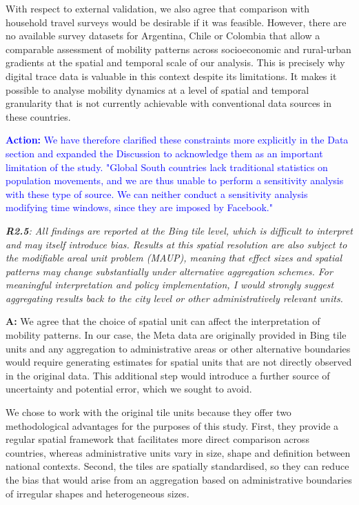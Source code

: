 \documentclass[12pt,a4paper,oneside, reqno]{amsart}
\begin{document}
With respect to external validation, we also agree that comparison with household travel surveys would be desirable if it was feasible. However, there are no available survey datasets for Argentina, Chile or Colombia that allow a comparable assessment of mobility patterns across socioeconomic and rural-urban gradients at the spatial and temporal scale of our analysis. This is precisely why digital trace data is valuable in this context despite its limitations. It makes it possible to analyse mobility dynamics at a level of spatial and temporal granularity that is not currently achievable with conventional data sources in these countries.

\textcolor{blue}{\textbf{Action:} We have therefore clarified these constraints more explicitly in the Data section and expanded the Discussion to acknowledge them as an important limitation of the study. "Global South countries lack traditional statistics on population movements, and we are thus unable to perform  a sensitivity analysis with these type of source. We can neither conduct a sensitivity analysis modifying time windows, since they are imposed by Facebook."}

\setlength{\leftskip}{0cm} \textit{\textbf{R2.5}: All findings are reported at the Bing tile level, which is difficult to interpret and may itself introduce bias. Results at this spatial resolution are also subject to the modifiable areal unit problem (MAUP), meaning that effect sizes and spatial patterns may change substantially under alternative aggregation schemes. For meaningful interpretation and policy implementation, I would strongly suggest aggregating results back to the city level or other administratively relevant units.}

\setlength{\leftskip}{1cm}\textbf{A:} We agree that the choice of spatial unit can affect the interpretation of mobility patterns. In our case, the Meta data are originally provided in Bing tile units and any aggregation to administrative areas or other alternative boundaries would require generating estimates for spatial units that are not directly observed in the original data. This additional step would introduce a further source of uncertainty and potential error, which we sought to avoid.

We chose to work with the original tile units because they offer two methodological advantages for the purposes of this study. First, they provide a regular spatial framework that facilitates more direct comparison across countries, whereas administrative units vary in size, shape and definition between national contexts. Second, the tiles are spatially standardised, so they can reduce the bias that would arise from an aggregation based on administrative boundaries of irregular shapes and heterogeneous sizes.
\end{document}
